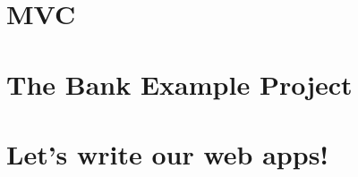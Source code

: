 \documentclass[fleqn,aspectratio=169,10pt]{beamer}
\begin{document}
\section{MVC}

\section{The Bank Example Project}

\section{Let's write our web apps!}
\end{document}
